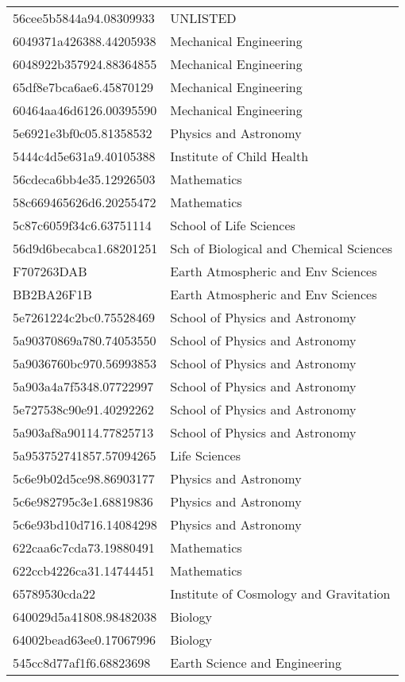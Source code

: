 \begin{tabular}{ll}
56cee5b5844a94.08309933 & UNLISTED \\
6049371a426388.44205938 & Mechanical Engineering \\
6048922b357924.88364855 & Mechanical Engineering \\
65df8e7bca6ae6.45870129 & Mechanical Engineering \\
60464aa46d6126.00395590 & Mechanical Engineering \\
5e6921e3bf0c05.81358532 & Physics and Astronomy \\
5444c4d5e631a9.40105388 & Institute of Child Health \\
56cdeca6bb4e35.12926503 & Mathematics \\
58c669465626d6.20255472 & Mathematics \\
5c87c6059f34c6.63751114 & School of Life Sciences \\
56d9d6becabca1.68201251 & Sch of Biological and Chemical Sciences \\
F707263DAB & Earth Atmospheric and Env Sciences \\
BB2BA26F1B & Earth Atmospheric and Env Sciences \\
5e7261224c2bc0.75528469 & School of Physics and Astronomy \\
5a90370869a780.74053550 & School of Physics and Astronomy \\
5a9036760bc970.56993853 & School of Physics and Astronomy \\
5a903a4a7f5348.07722997 & School of Physics and Astronomy \\
5e727538c90e91.40292262 & School of Physics and Astronomy \\
5a903af8a90114.77825713 & School of Physics and Astronomy \\
5a953752741857.57094265 & Life Sciences \\
5c6e9b02d5ce98.86903177 & Physics and Astronomy \\
5c6e982795c3e1.68819836 & Physics and Astronomy \\
5c6e93bd10d716.14084298 & Physics and Astronomy \\
622caa6c7cda73.19880491 & Mathematics \\
622ccb4226ca31.14744451 & Mathematics \\
65789530cda22 & Institute of Cosmology and Gravitation \\
640029d5a41808.98482038 & Biology \\
64002bead63ee0.17067996 & Biology \\
545cc8d77af1f6.68823698 & Earth Science and Engineering \\

\end{tabular}
